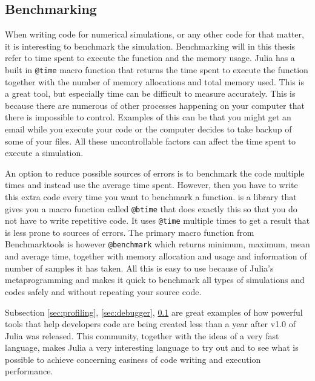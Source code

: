 \subsection{Benchmarking}
\label{sec:benchmarking}
When writing code for numerical simulations, or any other code for that matter, it is interesting to benchmark the simulation. Benchmarking will in this thesis refer to time spent to execute the function and the memory usage. Julia has a built in \texttt{@time} macro function \emph{\citep{@time}} that returns the time spent to execute the function together with the number of memory allocations and total memory used. This is a great tool, but especially time can be difficult to measure accurately. This is because there are numerous of other processes happening on your computer that there is impossible to control. Examples of this can be that you might get an email while you execute your code or the computer decides to take backup of some of your files. All these uncontrollable factors can affect the time spent to execute a simulation. 

An option to reduce possible sources of errors is to benchmark the code multiple times and instead use the average time spent. However, then you have to write this extra code every time you want to benchmark a function. \emph{\cite{BenchmarkTools}} is a library that gives you a macro function called \texttt{@btime} that does exactly this so that you do not have to write repetitive code. It uses \texttt{@time} multiple times to get a result that is less prone to sources of errors. The primary macro function from Benchmarktools is however \texttt{@benchmark} which returns minimum, maximum, mean and average time, together with memory allocation and usage and information of number of samples it has taken. All this is easy to use because of Julia's metaprogramming and makes it quick to benchmark all types of simulations and codes safely and without repeating your source code.

Subsection \ref{sec:profiling}, \ref{sec:debugger}, \ref{sec:benchmarking} are great examples of how powerful tools that help developers code are being created less than a year after v1.0 of Julia was released. This community, together with the ideas of a very fast language, makes Julia a very interesting language to try out and to see what is possible to achieve concerning easiness of code writing and execution performance.

